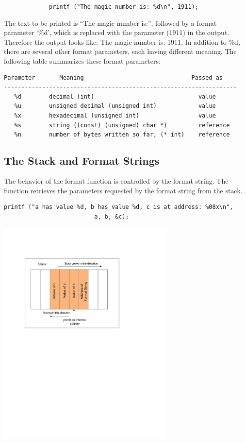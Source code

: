 \begin{verbatim}
             printf ("The magic number is: %d\n", 1911);
\end{verbatim}

The text to be printed is ``The magic number is:'', followed by a format
parameter `\%d', which is replaced with the parameter (1911) in the output.
Therefore the output looks like: The magic number is: 1911. In addition to
\%d,
there are several other format parameters, each having different meaning.
The
following table summarizes these format parameters:
\begin{Verbatim}[frame=single]
Parameter       Meaning                               Passed as
-------------------------------------------------------------------
   %d        decimal (int)                              value
   %u        unsigned decimal (unsigned int)            value
   %x        hexadecimal (unsigned int)                 value
   %s        string ((const) (unsigned) char *)         reference
   %n        number of bytes written so far, (* int)    reference
\end{Verbatim}

\subsection{The Stack and Format Strings}


The behavior of the format function is controlled by the format string.
The function retrieves the parameters requested by the format string
from the stack.

\begin{Verbatim}[frame=single]
printf ("a has value %d, b has value %d, c is at address: %08x\n", 
                          a, b, &c);
\end{Verbatim}


\begin{center}
\includegraphics*[viewport=1.10in 5.70in 6.1in 9.5in,width=3.5in]{Figs/Format_String_Stack.pdf}
\end{center}


